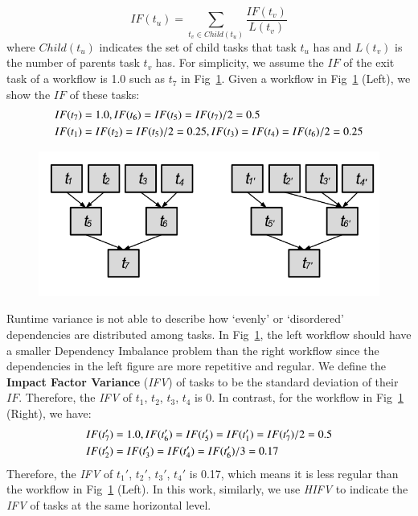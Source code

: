 \begin{equation}
 IF(t_u)=\sum_{t_v\in Child(t_u)}^{}\frac{IF(t_v)}{L(t_v)}
\end{equation}
where $Child(t_u)$ indicates the set of child tasks that task $t_u$ has and $L(t_v)$ is the number of parents task $t_v$ has. For simplicity, we assume the $IF$ of the exit task of a workflow is 1.0 such as $t_7$ in Fig~\ref{fig:hifv}. Given a workflow in Fig~\ref{fig:hifv} (Left), we show the $IF$ of these tasks:
\begin{eqnarray}
\displaystyle  
&IF(t_7 )=1.0, IF(t_6 )=IF(t_5 )=IF(t_7 )/2=0.5\nonumber  \\
&IF(t_1 )=IF(t_2 )=IF(t_5 )/2=0.25,IF(t_3 )=IF(t_4 )=IF(t_6 )/2=0.25\nonumber 
\end{eqnarray}


\begin{figure}
\centering
  \includegraphics[width=0.8\linewidth]{figures/balance/hifv.png}
  \label{fig:hifv}
\end{figure}


Runtime variance is not able to describe how `evenly' or `disordered' dependencies are distributed among tasks. In Fig~\ref{fig:hifv}, the left workflow should have a smaller Dependency Imbalance problem than the right workflow since the dependencies in the left figure are more repetitive and regular. We define the \textbf{Impact Factor Variance} ({\em IFV}) of tasks to be the standard deviation of their $IF$. Therefore, the {\em IFV} of {$t_1$, $t_2$, $t_3$, $t_4$} is 0. In contrast, for the workflow in Fig~\ref{fig:hifv} (Right), we have:
\begin{eqnarray}
\displaystyle  
&IF(t_7')=1.0, IF(t_6')=IF(t_5')=IF(t_1')=IF(t_7')/2=0.5\nonumber \\
&IF(t_2')=IF(t_3')=IF(t_4')=IF(t_6')/3=0.17 \nonumber
\end{eqnarray}
Therefore, the {\em IFV} of {$t_1'$, $t_2'$, $t_3'$, $t_4'$} is 0.17, which means it is less regular than the workflow in Fig~\ref{fig:hifv} (Left). In this work, similarly, we use {\em HIFV} to indicate the {\em IFV} of tasks at the same horizontal level. 

